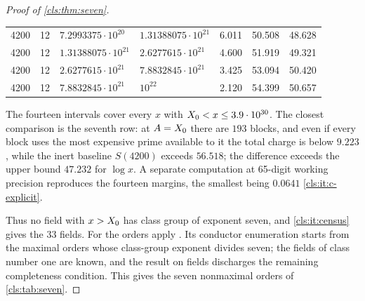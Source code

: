\begin{proof}[Proof of \cref{cls:thm:seven}]
\begin{center}
\begin{tabular}{rcllrrr}
4200 & 12 & $7.2993375\cdot10^{20}$ & $1.31388075\cdot10^{21}$ & 6.011 & 50.508 & 48.628\\
4200 & 12 & $1.31388075\cdot10^{21}$ & $2.6277615\cdot10^{21}$ & 4.600 & 51.919 & 49.321\\
4200 & 12 & $2.6277615\cdot10^{21}$ & $7.8832845\cdot10^{21}$ & 3.425 & 53.094 & 50.420\\
4200 & 12 & $7.8832845\cdot10^{21}$ & $10^{22}$ & 2.120 & 54.399 & 50.657\\\bottomrule
\end{tabular}
\end{center}
The fourteen intervals cover every $x$ with $X_0<x\le3.9\cdot10^{30}$. The closest
comparison is the seventh row: at $A=X_0$ there are $193$ blocks, and even if every
block uses the most expensive prime available to it the total charge is below $9.223$,
while the inert baseline $S(4200)$ exceeds $56.518$; the difference exceeds the upper
bound $47.232$ for $\log x$. A separate computation at 65-digit working precision
reproduces the fourteen margins, the smallest being $0.0641$ \ref{cls:it:c-explicit}.

Thus no field with $x>X_0$ has class group of exponent seven, and \ref{cls:it:census}
gives the $33$ fields. For the orders apply
\cite[Theorem~1.3(6) and Section~6]{Aiken2026Boundary}. Its conductor enumeration starts
from the maximal orders whose class-group exponent divides seven; the fields of class
number one are known, and the result on fields discharges the remaining completeness
condition. This gives the seven nonmaximal orders of \cref{cls:tab:seven}.
\end{proof}

